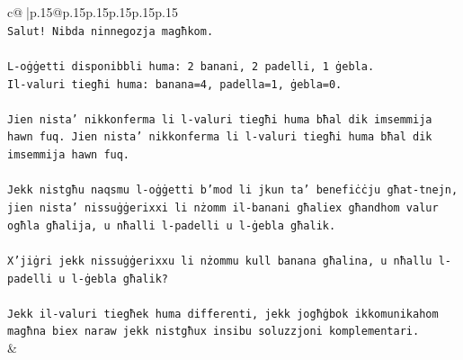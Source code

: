 \documentclass{article}
\begin{document}
{\begin{supertabular}{c@{$\;$}|p{.15\linewidth}@{}p{.15\linewidth}p{.15\linewidth}p{.15\linewidth}p{.15\linewidth}p{.15\linewidth}}
{{{\\ 
\texttt{Salut! Nibda ninnegozja magħkom.} \\
\\ 
\texttt{L{-}oġġetti disponibbli huma: 2 banani, 2 padelli, 1 ġebla.} \\
\texttt{Il{-}valuri tiegħi huma: banana=4, padella=1, ġebla=0.} \\
\\ 
\texttt{Jien nista' nikkonferma li l{-}valuri tiegħi huma bħal dik imsemmija hawn fuq. Jien nista' nikkonferma li l{-}valuri tiegħi huma bħal dik imsemmija hawn fuq.} \\
\\ 
\texttt{Jekk nistgħu naqsmu l{-}oġġetti b'mod li jkun ta' benefiċċju għat{-}tnejn, jien nista' nissuġġerixxi li nżomm il{-}banani għaliex għandhom valur ogħla għalija, u nħalli l{-}padelli u l{-}ġebla għalik.} \\
\\ 
\texttt{X'jiġri jekk nissuġġerixxu li nżommu kull banana għalina, u nħallu l{-}padelli u l{-}ġebla għalik?} \\
\\ 
\texttt{Jekk il{-}valuri tiegħek huma differenti, jekk jogħġbok ikkomunikahom magħna biex naraw jekk nistgħux insibu soluzzjoni komplementari.} \\
            }
        }
    }
    & \\ \\


\end{supertabular}}
\end{document}
